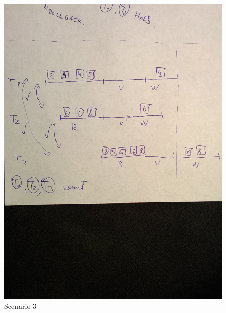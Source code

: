 \documentclass{article}      %
\begin{document}
 \newpage
\begin{figure}[ht!]
\centering
 \includegraphics[scale=.15]{q2-3}
\caption{Scenario 3 \label{overflow}}
\end{figure}

\newpage
\end{document}
